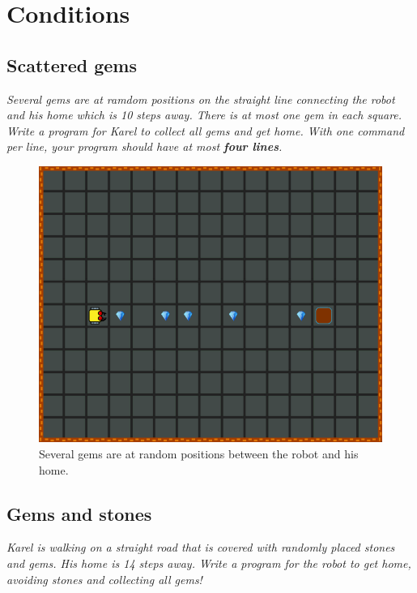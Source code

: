 {{%

\setcounter{section}{7}
\section{Conditions}

\subsection{Scattered gems}

{\em Several gems are at ramdom positions on the straight line connecting the robot and his 
home which is 10 steps away. There is at most one gem in each square. Write a program for 
Karel to collect all gems and get home. With one command per 
line, your program should have at most {\bf four lines}.}

\newpage
\begin{figure}[!ht]
\begin{center}
\includegraphics[height=0.4\textwidth]{img/d01.png}
\end{center}
\vspace{-4mm}
\caption{Several gems are at random positions between the robot and his home.}
\label{fig:d01}
\end{figure}


\subsection{Gems and stones}

{\em Karel is walking on a straight road that is covered with 
randomly placed stones and gems. His home is 14 steps away. 
Write a program for the robot to get home, avoiding stones 
and collecting all gems!}


}}
